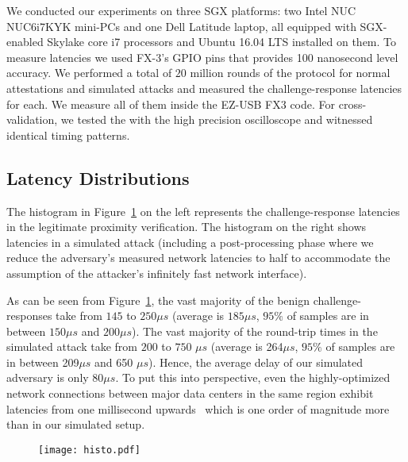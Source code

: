 We conducted our experiments on three SGX platforms: two Intel NUC NUC6i7KYK mini-PCs and one Dell Latitude laptop, all equipped with SGX-enabled Skylake core i7 processors and Ubuntu 16.04 LTS installed on them. To measure latencies we used FX-3's GPIO pins that provides 100 nanosecond level accuracy. We performed a total of $20$ million rounds of the protocol for normal attestations and simulated attacks and measured the challenge-response latencies for each. We measure all of them inside the EZ-USB FX3 code. For cross-validation, we tested the \device with the high precision oscilloscope and witnessed identical timing patterns.


\subsection{Latency Distributions}
\label{sec:evaluation:results}



The histogram in Figure~\ref{graph:instatAttackerHisto} on the left represents the challenge-response latencies in the legitimate proximity verification. The histogram on the right shows latencies in a simulated attack (including a post-processing phase where we reduce the adversary's measured network latencies to half to accommodate the assumption of the attacker's infinitely fast network interface).

As can be seen from Figure~\ref{graph:instatAttackerHisto}, the vast majority of the benign challenge-responses take from $145$ to $250 \mu s$ (average is $185 \mu s$, $95\%$ of samples are in between $150\mu s$ and  $200\mu s$). The vast majority of the round-trip times in the simulated attack take from $200$ to $750$ $\mu s$ (average is 264$\mu s$, $95\%$ of samples are in between 209$\mu s$ and 650 $\mu s$). Hence, the average delay of our simulated adversary is only $80 \mu s$. To put this into perspective, even the highly-optimized network connections between major data centers in the same region exhibit latencies from one millisecond upwards~\cite{agarwal_agarwal_2018} which is one order of magnitude more than in our simulated setup.



\begin{figure}[t]
  \centering
    \texttt{[image: histo.pdf]} 
    \caption{}
    \figsaver
    \label{graph:instatAttackerHisto}
\end{figure}



